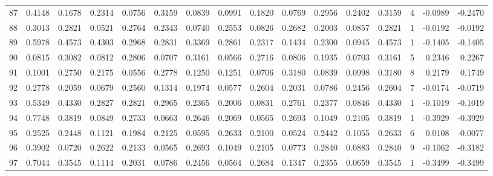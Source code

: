 \begin{tabular}{lrrrrrrrrrrrrrrr}
87  &      0.4148 &  0.1678 &  0.2314 &  0.0756 &  0.3159 &  0.0839 &  0.0991 &  0.1820 &  0.0769 &  0.2956 &   0.2402 &     0.3159 &      4 &                   -0.0989 &                    -0.2470 \\
88  &      0.3013 &  0.2821 &  0.0521 &  0.2764 &  0.2343 &  0.0740 &  0.2553 &  0.0826 &  0.2682 &  0.2003 &   0.0857 &     0.2821 &      1 &                   -0.0192 &                    -0.0192 \\
89  &      0.5978 &  0.4573 &  0.4303 &  0.2968 &  0.2831 &  0.3369 &  0.2861 &  0.2317 &  0.1434 &  0.2300 &   0.0945 &     0.4573 &      1 &                   -0.1405 &                    -0.1405 \\
90  &      0.0815 &  0.3082 &  0.0812 &  0.2806 &  0.0707 &  0.3161 &  0.0566 &  0.2716 &  0.0806 &  0.1935 &   0.0703 &     0.3161 &      5 &                    0.2346 &                     0.2267 \\
91  &      0.1001 &  0.2750 &  0.2175 &  0.0556 &  0.2778 &  0.1250 &  0.1251 &  0.0706 &  0.3180 &  0.0839 &   0.0998 &     0.3180 &      8 &                    0.2179 &                     0.1749 \\
92  &      0.2778 &  0.2059 &  0.0679 &  0.2560 &  0.1314 &  0.1974 &  0.0577 &  0.2604 &  0.2031 &  0.0786 &   0.2456 &     0.2604 &      7 &                   -0.0174 &                    -0.0719 \\
93  &      0.5349 &  0.4330 &  0.2827 &  0.2821 &  0.2965 &  0.2365 &  0.2006 &  0.0831 &  0.2761 &  0.2377 &   0.0846 &     0.4330 &      1 &                   -0.1019 &                    -0.1019 \\
94  &      0.7748 &  0.3819 &  0.0849 &  0.2733 &  0.0663 &  0.2646 &  0.2069 &  0.0565 &  0.2693 &  0.1049 &   0.2105 &     0.3819 &      1 &                   -0.3929 &                    -0.3929 \\
95  &      0.2525 &  0.2448 &  0.1121 &  0.1984 &  0.2125 &  0.0595 &  0.2633 &  0.2100 &  0.0524 &  0.2442 &   0.1055 &     0.2633 &      6 &                    0.0108 &                    -0.0077 \\
96  &      0.3902 &  0.0720 &  0.2622 &  0.2133 &  0.0565 &  0.2693 &  0.1049 &  0.2105 &  0.0773 &  0.2840 &   0.0883 &     0.2840 &      9 &                   -0.1062 &                    -0.3182 \\
97  &      0.7044 &  0.3545 &  0.1114 &  0.2031 &  0.0786 &  0.2456 &  0.0564 &  0.2684 &  0.1347 &  0.2355 &   0.0659 &     0.3545 &      1 &                   -0.3499 &                    -0.3499 \\

\end{tabular}
